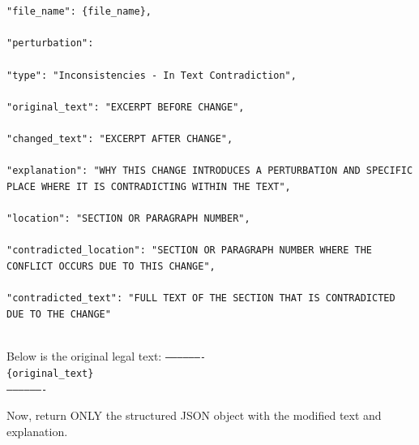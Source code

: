 \documentclass[11pt]{article}
\begin{document}
\begin{tcolorbox}[breakable,colback=lightestgray,colframe=black,title=\textbf{Inconsistency In-Text Data Generation Prompt}]
{\small
\texttt{"file\_name": \{file\_name\},\\\\
"perturbation": \\\\
"type": "Inconsistencies - In Text Contradiction",\\\\
"original\_text": "EXCERPT BEFORE CHANGE",\\\\
"changed\_text": "EXCERPT AFTER CHANGE",\\\\
"explanation": "WHY THIS CHANGE INTRODUCES A PERTURBATION AND SPECIFIC PLACE WHERE IT IS CONTRADICTING WITHIN THE TEXT",\\\\
"location": "SECTION OR PARAGRAPH NUMBER",\\\\
"contradicted\_location": "SECTION OR PARAGRAPH NUMBER WHERE THE CONFLICT OCCURS DUE TO THIS CHANGE",\\\\
"contradicted\_text": "FULL TEXT OF THE SECTION THAT IS CONTRADICTED DUE TO THE CHANGE"\\\\}
}

Below is the original legal text:
\texttt{-------------------}\\
\texttt{\{original\_text\}}\\
\texttt{-------------------}

Now, return ONLY the structured JSON object with the modified text and explanation.
\end{tcolorbox}
\end{document}
